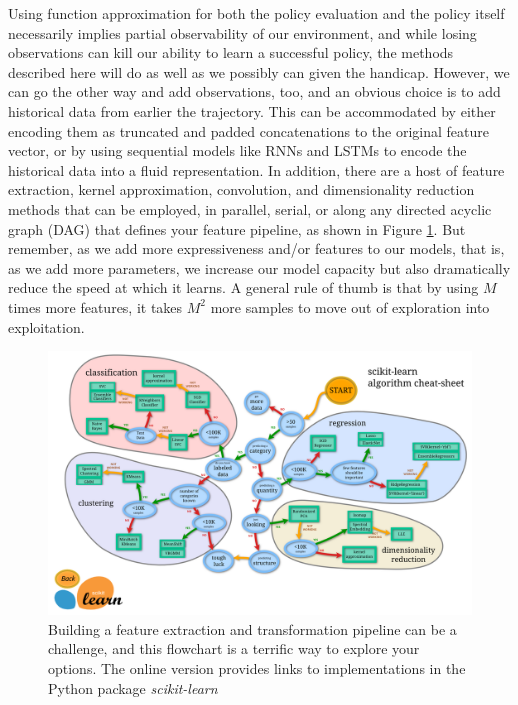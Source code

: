 \documentclass{article}
\begin{document}
Using function approximation for both the policy evaluation and the policy itself necessarily implies partial observability of our environment, and while losing observations can kill our ability to learn a successful policy, the methods described here will do as well as we possibly can given the handicap. However, we can go the other way and add observations, too, and an obvious choice is to add historical data from earlier the trajectory. This can be accommodated by either encoding them as truncated and padded concatenations to the original feature vector, or by using sequential models like RNNs and LSTMs to encode the historical data into a fluid representation. In addition, there are a host of feature extraction, kernel approximation, convolution, and dimensionality reduction methods that can be employed, in parallel, serial, or along any directed acyclic graph (DAG) that defines your feature pipeline, as shown in Figure \ref{fig:ml_map}. But remember, as we add more expressiveness and/or features to our models, that is, as we add more parameters, we increase our model capacity but also dramatically reduce the speed at which it learns. A general rule of thumb is that by using $M$ times more features, it takes $M^2$ more samples to move out of exploration into exploitation.
\begin{figure}
\label{fig:ml_map}
    \begin{center}
    \includegraphics[width=0.75\linewidth]{ml_map.png}
    \caption{Building a feature extraction and transformation pipeline can be a challenge, and this flowchart is a terrific way to explore your options. The online version provides links to implementations in the Python package \textit{scikit-learn} \footnotemark}
    \end{center}
\end{figure}
\end{document}
